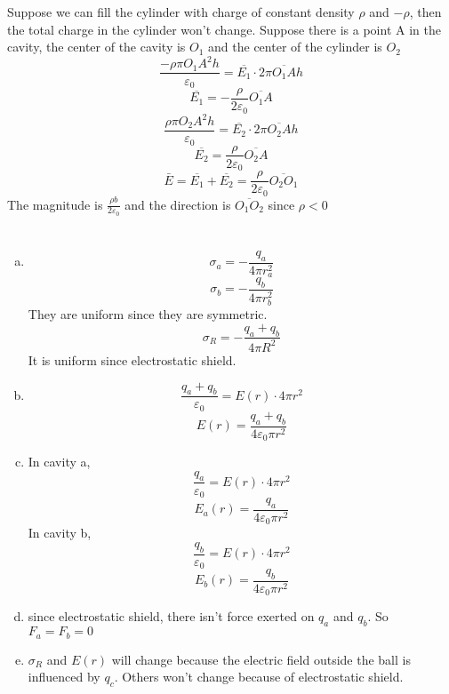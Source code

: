 \documentclass{article}
\begin{document}
\section{}
Suppose we can fill the cylinder with charge of constant density $\rho$ and $-\rho$, then the total charge in the cylinder won't change.
Suppose there is a point A in the cavity, the center of the cavity is $O_1$ and the center of the cylinder is $O_2$
$$\frac{-\rho\pi O_1A^2h}{\varepsilon_0}=\overline{E_1}\cdot2\pi\overline{O_1A}h$$
$$\overline{E_1}=-\frac{\rho}{2\varepsilon_0}\overline{O_1A}$$
$$\frac{\rho\pi O_2A^2h}{\varepsilon_0}=\overline{E_2}\cdot2\pi\overline{O_2A}h$$
$$\overline{E_2}=\frac{\rho}{2\varepsilon_0}\overline{O_2A}$$
$$\bar{E}=\overline{E_1}+\overline{E_2}=\frac{\rho}{2\varepsilon_0}\overline{O_2O_1}$$
The magnitude is $\frac{\rho b}{2\varepsilon_0}$ and the direction is $\overline{O_1O_2}$ since $\rho<0$

\section{}
\begin{enumerate}[(a)]
\item
$$\sigma_a=-\frac{q_a}{4\pi r_a^2}$$
$$\sigma_b=-\frac{q_b}{4\pi r_b^2}$$
They are uniform since they are symmetric.
$$\sigma_R=-\frac{q_a+q_b}{4\pi R^2}$$
It is uniform since electrostatic shield.
\item
$$\frac{q_a+q_b}{\varepsilon_0}=E(r)\cdot4\pi r^2$$
$$E(r)=\frac{q_a+q_b}{4\varepsilon_0\pi r^2}$$
\item
In cavity a,
$$\frac{q_a}{\varepsilon_0}=E(r)\cdot4\pi r^2$$
$$E_a(r)=\frac{q_a}{4\varepsilon_0\pi r^2}$$
In cavity b,
$$\frac{q_b}{\varepsilon_0}=E(r)\cdot4\pi r^2$$
$$E_b(r)=\frac{q_b}{4\varepsilon_0\pi r^2}$$
\item
since electrostatic shield, there isn't force exerted on $q_a$ and $q_b$. So $F_a=F_b=0$
\item
$\sigma_R$ and $E(r)$ will change because the electric field outside the ball is influenced by $q_c$.
Others won't change because of electrostatic shield.

\end{enumerate}
\end{document}

